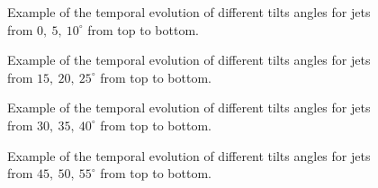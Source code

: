 \documentclass[12pt]{ociamthesis}
\begin{document}
\begin{figure}
\captionsetup[subfigure]{labelformat=empty}
\centering
{}
\caption{Example of the temporal evolution of different tilts angles for jets from $0,~5,~10^{\circ}$ from top to bottom.}
\label{tj_morph_1}
\end{figure}
\begin{figure}
\captionsetup[subfigure]{labelformat=empty}
\centering
{}
\caption{Example of the temporal evolution of different tilts angles for jets from $15,~20,~25^{\circ}$ from top to bottom.}
\label{tj_morph_2}
\end{figure}
\begin{figure}
\captionsetup[subfigure]{labelformat=empty}
\centering
{}
\caption{Example of the temporal evolution of different tilts angles for jets from $30,~35,~40^{\circ}$ from top to bottom.}
\label{tj_morph_3}
\end{figure}
\begin{figure}
\captionsetup[subfigure]{labelformat=empty}
\centering
{}
\caption{Example of the temporal evolution of different tilts angles for jets from $45,~50,~55^{\circ}$ from top to bottom.}
\label{tj_morph_4}
\end{figure}
\end{document}
